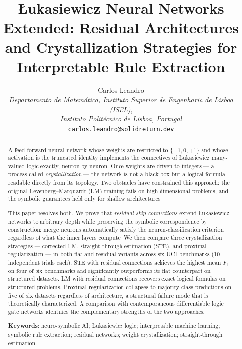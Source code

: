 \documentclass[lettersize,journal]{IEEEtran}
\begin{document}
\title{\L{}ukasiewicz Neural Networks Extended: Residual Architectures and
       Crystallization Strategies for Interpretable Rule Extraction}

\author{Carlos Leandro\\
  \textit{Departamento de Matem\'atica,
  Instituto Superior de Engenharia de Lisboa (ISEL)},\\
  \textit{Instituto Polit\'ecnico de Lisboa, Portugal}\\
  \texttt{carlos.leandro@solidreturn.dev}}

\date{}
\maketitle

\begin{abstract}
A feed-forward neural network whose weights are restricted to $\{-1,0,+1\}$
and whose activation is the truncated identity implements the connectives of
\L{}ukasiewicz many-valued logic exactly, neuron by neuron.
Once weights are driven to integers --- a process called \emph{crystallization}
--- the network is not a black-box but a logical formula readable directly from
its topology.
Two obstacles have constrained this approach: the original
Levenberg--Marquardt (LM) training fails on high-dimensional problems, and the
symbolic guarantees held only for shallow architectures.

This paper resolves both.
We prove that \emph{residual skip connections} extend \L{}ukasiewicz networks
to arbitrary depth while preserving the symbolic correspondence by construction:
merge neurons automatically satisfy the neuron-classification criterion
regardless of what the inner layers compute.
We then compare three crystallization strategies --- corrected LM,
straight-through estimation (STE), and proximal regularization --- in both flat
and residual variants across six UCI benchmarks (10 independent trials each).
STE with residual connections achieves the highest mean $F_1$ on four of six
benchmarks and significantly outperforms its flat counterpart on structured
datasets.
LM with residual connections recovers exact logical formulas on structured
problems.
Proximal regularization collapses to majority-class predictions on five of six
datasets regardless of architecture, a structural failure mode that is
theoretically characterized.
A comparison with contemporaneous differentiable logic gate networks identifies
the complementary strengths of the two approaches.

\noindent\textbf{Keywords:} neuro-symbolic AI; \L{}ukasiewicz logic;
interpretable machine learning; symbolic rule extraction; residual networks;
weight crystallization; straight-through estimation.
\end{abstract}
\end{document}
